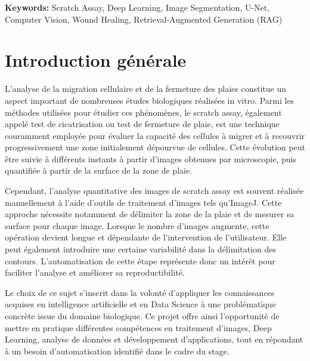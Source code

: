 \documentclass[12pt,a4paper]{report}
\begin{document}
\vspace{0.3cm}
\noindent
\textbf{Keywords:} Scratch Assay, Deep Learning, Image Segmentation, U-Net, Computer Vision, Wound Healing, Retrieval-Augmented Generation (RAG)

\chapter*{Introduction générale}

\noindent
\hspace{1cm}L'analyse de la migration cellulaire et de la fermeture des plaies constitue un aspect important de nombreuses études biologiques réalisées in vitro. Parmi les méthodes utilisées pour étudier ces phénomènes, le scratch assay, également appelé test de cicatrisation ou test de fermeture de plaie, est une technique couramment employée pour évaluer la capacité des cellules à migrer et à recouvrir progressivement une zone initialement dépourvue de cellules. Cette évolution peut être suivie à différents instants à partir d'images obtenues par microscopie, puis quantifiée à partir de la surface de la zone de plaie.

\vspace{0.3cm}
\noindent
\hspace{1cm}Cependant, l'analyse quantitative des images de scratch assay est souvent réalisée manuellement à l'aide d'outils de traitement d'images tels qu'ImageJ. Cette approche nécessite notamment de délimiter la zone de la plaie et de mesurer sa surface pour chaque image. Lorsque le nombre d'images augmente, cette opération devient longue et dépendante de l'intervention de l'utilisateur. Elle peut également introduire une certaine variabilité dans la délimitation des contours. L'automatisation de cette étape représente donc un intérêt pour faciliter l'analyse et améliorer sa reproductibilité.

\vspace{0.3cm}
\noindent
\hspace{1cm}Le choix de ce sujet s'inscrit dans la volonté d'appliquer les connaissances acquises en intelligence artificielle et en Data Science à une problématique concrète issue du domaine biologique. Ce projet offre ainsi l'opportunité de mettre en pratique différentes compétences en traitement d'images, Deep Learning, analyse de données et développement d'applications, tout en répondant à un besoin d'automatisation identifié dans le cadre du stage.
\end{document}

